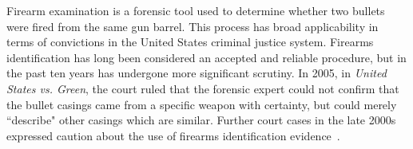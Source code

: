 \documentclass[aoas, preprint]{imsart}\usepackage[]{graphicx}\usepackage[]{color}
\begin{document}
Firearm examination is a forensic tool used to determine whether two bullets were fired from the same gun barrel. This process has broad applicability in terms of convictions in the United States criminal justice system. Firearms identification has long been considered an accepted and reliable procedure, but in the past ten years has undergone more significant scrutiny. In 2005, in \emph{United States vs. Green}, the court ruled that the forensic expert could not confirm that the bullet casings came from a specific weapon with certainty, but could merely ``describe" other casings which are similar. Further court cases in the late 2000s expressed caution about the use of firearms identification evidence~\citep{giannelli:2011}.
\end{document}
